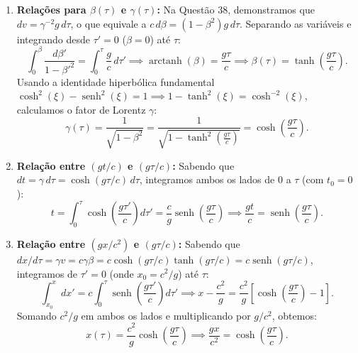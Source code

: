 \documentclass[11pt, a4paper]{article}
\begin{document}
\begin{enumerate}[label=\alph*)]
    \item \textbf{Relações para $\beta(\tau)$ e $\gamma(\tau)$:} Na Questão 38, demonstramos que $dv = \gamma^{-2} g \, d\tau$, o que equivale a $c \, d\beta = (1 - \beta^2) g \, d\tau$. Separando as variáveis e integrando desde $\tau' = 0$ ($\beta = 0$) até $\tau$:
    \begin{equation}
    \int_{0}^{\beta} \frac{d\beta'}{1 - \beta'^2} = \int_{0}^{\tau} \frac{g}{c} \, d\tau' \implies \operatorname{arctanh}(\beta) = \frac{g \tau}{c} \implies \beta(\tau) = \tanh\left(\frac{g \tau}{c}\right).
    \end{equation}
    Usando a identidade hiperbólica fundamental $\cosh^2(\xi) - \operatorname{senh}^2(\xi) = 1 \implies 1 - \tanh^2(\xi) = \cosh^{-2}(\xi)$, calculamos o fator de Lorentz $\gamma$:
    \begin{equation}
    \gamma(\tau) = \frac{1}{\sqrt{1 - \beta^2}} = \frac{1}{\sqrt{1 - \tanh^2\left(\frac{g \tau}{c}\right)}} = \cosh\left(\frac{g \tau}{c}\right).
    \end{equation}

    \item \textbf{Relação entre $(gt/c)$ e $(g\tau/c)$:} Sabendo que $dt = \gamma \, d\tau = \cosh(g\tau/c) \, d\tau$, integramos ambos os lados de $0$ a $\tau$ (com $t_0 = 0$):
    \begin{equation}
    t = \int_{0}^{\tau} \cosh\left(\frac{g \tau'}{c}\right) d\tau' = \frac{c}{g} \operatorname{senh}\left(\frac{g \tau}{c}\right) \implies \frac{g t}{c} = \operatorname{senh}\left(\frac{g \tau}{c}\right). \label{eq:gt_senh}
    \end{equation}

    \item \textbf{Relação entre $(gx/c^2)$ e $(g\tau/c)$:} Sabendo que $dx/d\tau = \gamma v = c \gamma \beta = c \cosh(g\tau/c) \tanh(g\tau/c) = c \operatorname{senh}(g\tau/c)$, integramos de $\tau' = 0$ (onde $x_0 = c^2/g$) até $\tau$:
    \begin{equation}
    \int_{x_0}^{x} dx' = c \int_{0}^{\tau} \operatorname{senh}\left(\frac{g \tau'}{c}\right) d\tau' \implies x - \frac{c^2}{g} = \frac{c^2}{g} \left[ \cosh\left(\frac{g \tau}{c}\right) - 1 \right].
    \end{equation}
    Somando $c^2/g$ em ambos os lados e multiplicando por $g/c^2$, obtemos:
    \begin{equation}
    x(\tau) = \frac{c^2}{g} \cosh\left(\frac{g \tau}{c}\right) \implies \frac{g x}{c^2} = \cosh\left(\frac{g \tau}{c}\right). \label{eq:gx_cosh}
    \end{equation}


\end{enumerate}
\end{document}
